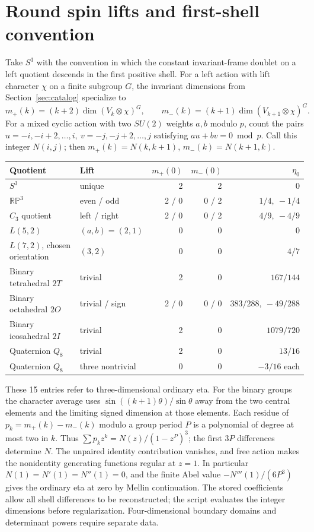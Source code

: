 \section{Round spin lifts and first-shell convention}\label{app:spheres}
Take \(S^3\) with the convention in which the constant invariant-frame doublet on a left quotient descends in the first positive shell. For a left action with lift character \(\chi\) on a finite subgroup \(G\), the invariant dimensions from Section~\ref{sec:catalog} specialize to
\[
 m_+(k)=(k+2)\dim(V_k\otimes\chi)^G,\qquad
 m_-(k)=(k+1)\dim(V_{k+1}\otimes\chi)^G .
\]
For a mixed cyclic action with two \(SU(2)\) weights \(a,b\) modulo \(p\), count the pairs \(u=-i,-i+2,\dots,i,\ v=-j,-j+2,\dots,j\) satisfying \(au+bv=0\bmod p\). Call this integer \(N(i,j)\); then \(m_+(k)=N(k,k+1)\), \(m_-(k)=N(k+1,k)\).

\begin{center}\small
\begin{tabular}{@{}llrrr@{}}\toprule
Quotient & Lift & \(m_+(0)\)& \(m_-(0)\)& \(\eta_0\)\\\midrule
\(S^3\) & unique &2&2&0\\
\(\mathbb{RP}^3\) & even / odd &2 / 0&0 / 2&\(1/4,\ -1/4\)\\
\(C_3\) quotient & left / right &2 / 0&0 / 2&\(4/9,\ -4/9\)\\
\(L(5,2)\) & \((a,b)=(2,1)\) &0&0&0\\
\(L(7,2)\), chosen orientation & \((3,2)\) &0&0&\(4/7\)\\
Binary tetrahedral \(2T\)&trivial&2&0&\(167/144\)\\
Binary octahedral \(2O\)&trivial / sign&2 / 0&0 / 0&\(383/288,\ -49/288\)\\
Binary icosahedral \(2I\)&trivial&2&0&\(1079/720\)\\
Quaternion \(Q_8\)&trivial&2&0&\(13/16\)\\
Quaternion \(Q_8\)&three nontrivial&0&0&\(-3/16\) each\\\bottomrule
\end{tabular}
\end{center}
These 15 entries refer to three-dimensional ordinary eta. For the binary groups the character average uses \(\sin((k+1)\theta)/\sin\theta\) away from the two central elements and the limiting signed dimension at those elements. Each residue of \(p_k=m_+(k)-m_-(k)\) modulo a group period \(P\) is a polynomial of degree at most two in \(k\). Thus \(\sum p_k z^k=N(z)/(1-z^P)^3\); the first \(3P\) differences determine \(N\). The unpaired identity contribution vanishes, and free action makes the nonidentity generating functions regular at \(z=1\). In particular \(N(1)=N'(1)=N''(1)=0\), and the finite Abel value \(-N'''(1)/(6P^3)\) gives the ordinary eta at zero by Mellin continuation. The stored coefficients allow all shell differences to be reconstructed; the script evaluates the integer dimensions before regularization. Four-dimensional boundary domains and determinant powers require separate data.
